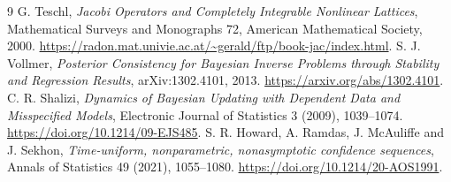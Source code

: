 \begin{thebibliography}{9}
G. Teschl, \emph{Jacobi Operators and Completely Integrable Nonlinear
Lattices}, Mathematical Surveys and Monographs 72, American Mathematical
Society, 2000.
\url{https://radon.mat.univie.ac.at/~gerald/ftp/book-jac/index.html}.
S. J. Vollmer, \emph{Posterior Consistency for Bayesian Inverse Problems
through Stability and Regression Results}, arXiv:1302.4101, 2013.
\url{https://arxiv.org/abs/1302.4101}.
C. R. Shalizi, \emph{Dynamics of Bayesian Updating with Dependent Data and
Misspecified Models}, Electronic Journal of Statistics 3 (2009), 1039--1074.
\url{https://doi.org/10.1214/09-EJS485}.
S. R. Howard, A. Ramdas, J. McAuliffe and J. Sekhon,
\emph{Time-uniform, nonparametric, nonasymptotic confidence sequences},
Annals of Statistics 49 (2021), 1055--1080.
\url{https://doi.org/10.1214/20-AOS1991}.
\end{thebibliography}
